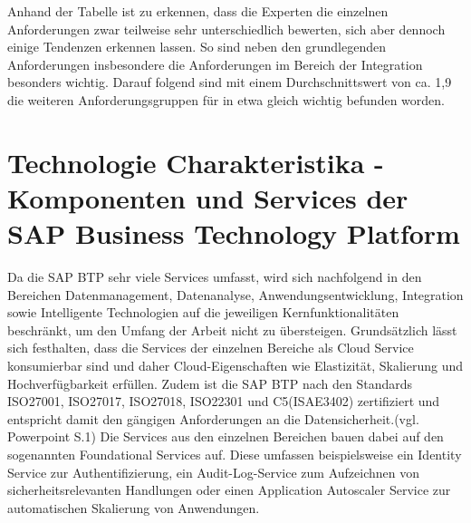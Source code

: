
Anhand der Tabelle ist zu erkennen, dass die Experten die einzelnen Anforderungen zwar teilweise sehr unterschiedlich bewerten, sich aber dennoch einige Tendenzen erkennen lassen. So sind neben den grundlegenden Anforderungen insbesondere die Anforderungen im Bereich der Integration besonders wichtig. Darauf folgend sind mit einem Durchschnittswert von ca. 1,9 die weiteren Anforderungsgruppen für in etwa gleich wichtig befunden worden. 









\section{Technologie Charakteristika - Komponenten und Services der SAP Business Technology Platform}\label{sec:TechCharak}


Da die SAP BTP sehr viele Services umfasst, wird sich nachfolgend in den Bereichen Datenmanagement, Datenanalyse, Anwendungsentwicklung, Integration sowie Intelligente Technologien auf die jeweiligen Kernfunktionalitäten beschränkt, um den Umfang der Arbeit nicht zu übersteigen. Grundsätzlich lässt sich festhalten, dass die Services der einzelnen Bereiche als Cloud Service konsumierbar sind und daher Cloud-Eigenschaften wie Elastizität, Skalierung und Hochverfügbarkeit erfüllen. \autocite[Vgl.][S. 60]{SEUBERT} Zudem ist die SAP BTP nach den Standards ISO27001, ISO27017, ISO27018, ISO22301 und C5(ISAE3402) zertifiziert und entspricht damit den gängigen Anforderungen an die Datensicherheit.(vgl. Powerpoint S.1) Die Services aus den einzelnen Bereichen bauen dabei auf den sogenannten Foundational Services auf. Diese umfassen beispielsweise ein Identity Service zur Authentifizierung, ein Audit-Log-Service zum Aufzeichnen von sicherheitsrelevanten Handlungen oder einen Application Autoscaler Service zur automatischen Skalierung von Anwendungen. \autocite[Vgl.][S. 58]{SEUBERT}


